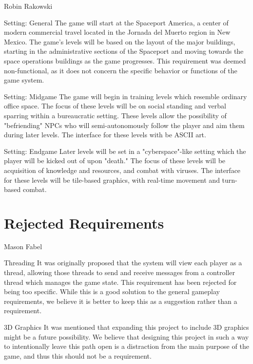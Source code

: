 \documentclass[12pt]{report}
\begin{document}
\begin{section}{Robin Rakowski}

\begin{subsection}{Setting: General}
The game will start at the Spaceport America, a center of modern commercial travel located in the Jornada del Muerto region in New Mexico. The game's levels will be based on the layout of the major buildings, starting in the administrative sections of the Spaceport and moving towards the space operations buildings as the game progresses. This requirement was deemed non-functional, as it does not concern the specific behavior or functions of the game system.
\end{subsection}

\begin{subsection}{Setting: Midgame}
The game will begin in training levels which resemble ordinary office space. The focus of these levels will be on social standing and verbal sparring within a bureaucratic setting. These levels allow the possibility of "befriending" NPCs who will semi-autonomously follow the player and aim them during later levels. The interface for these levels with be ASCII art.
\end{subsection}

\begin{subsection}{Setting: Endgame}
Later levels will be set in a "cyberspace"-like setting which the player will be kicked out of upon "death." The focus of these levels will be acquisition of knowledge and resources, and combat with viruses. The interface for these levels will be tile-based graphics, with real-time movement and turn-based combat.
\end{subsection}


\end{section}



\chapter{Rejected Requirements}

\begin{section}{Mason Fabel}
\begin{subsection}{Threading}
It was originally proposed that the system will view each player as a
thread, allowing those threads to send and receive messages from a
controller thread which manages the game state. This requirement has been
rejected for being too specific. While this is a good solution to the
general gameplay requirements, we believe it is better to keep this as a
suggestion rather than a requirement.
\end{subsection}

\begin{subsection}{3D Graphics}
It was mentioned that expanding this project to include 3D graphics might
be a future possibility. We believe that designing this project in such a
way to intentionally leave this path open is a distraction from the main
purpose of the game, and thus this should not be a requirement.
\end{subsection}
\end{section}
\end{document}
